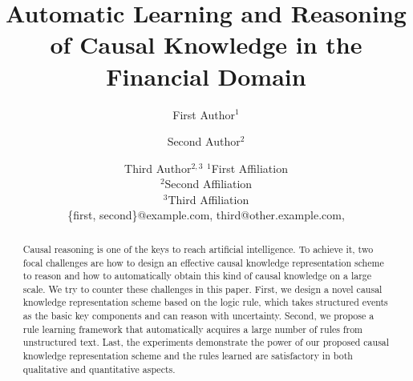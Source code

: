 \documentclass{article}
\title{Automatic Learning and Reasoning of Causal Knowledge in the Financial Domain}
\author{
First Author$^1$
\and
Second Author$^2$\and
Third Author$^{2,3}$
\affiliations
$^1$First Affiliation\\
$^2$Second Affiliation\\
$^3$Third Affiliation\\
\emails
\{first, second\}@example.com,
third@other.example.com,
}
\begin{document}
\maketitle
\begin{abstract}
Causal reasoning is one of the keys to reach artificial intelligence. 
To achieve it, two focal challenges are how to design an effective causal knowledge representation scheme to reason and how to automatically obtain this kind of causal knowledge on a large scale. 
We try to counter these challenges in this paper. First, we design a novel causal knowledge representation scheme based on the logic rule, which takes structured events as the basic key components and can reason with uncertainty.
Second, we propose a rule learning framework that automatically acquires a large number of rules from unstructured text. 
Last, the experiments demonstrate the power of our proposed causal knowledge representation scheme and the rules learned are satisfactory in both qualitative and quantitative aspects. 
\end{abstract}
\begin{CJK}{UTF8}{gkai}
	
	
	
	
	\clearpage
	
	
\end{CJK}
\end{document}
